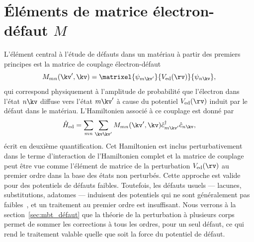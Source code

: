\section{Éléments de matrice électron-défaut $M$}\label{sec:M_défaut}

L'élément central à l'étude de défauts dans un matériau à partir des premiers principes est la matrice de couplage électron-défaut
\begin{equation}
    M_{mn}(\kv',\kv) = \matrixel{\psi_{m\kv'}}{V_\text{ed}(\rv)}{\psi_{n\kv}},\label{eqn:M}
\end{equation}
qui correspond physiquement à l'amplitude de probabilité que l'électron dans l'état $n\kv$ diffuse vers l'état $m\kv'$ à cause du potentiel $V_\text{ed}(\rv)$ induit par le défaut dans le matériau. L'Hamiltonien associé à ce couplage est donné par
\begin{equation}
    \hat{H}_\text{ed} = \sum_{mn}\sum_{\kv\kv'}M_{mn}(\kv',\kv)\hat{c}^\dag_{m\kv'}\hat{c}_{n\kv},
\end{equation}
écrit en deuxième quantification. Cet Hamiltonien est inclus perturbativement dans le terme d'interaction de l'Hamiltonien complet et la matrice de couplage peut être vue comme l'élément de matrice de la perturbation $V_\text{ed}(\rv)$ au premier ordre dans la base des états non perturbés. Cette approche est valide pour des potentiels de défauts faibles. Toutefois, les défauts usuels --- lacunes, substitutions, adatomes --- induisent des potentiels qui ne sont généralement pas faibles~\cite{banhartStructuralDefectsGraphene2011}, et un traitement au premier ordre est insuffisant. Nous verrons à la section~\ref{sec:mbt_défaut} que la théorie de la perturbation à plusieurs corps permet de sommer les corrections à tous les ordres, pour un seul défaut, ce qui rend le traitement valable quelle que soit la force du potentiel de défaut.

